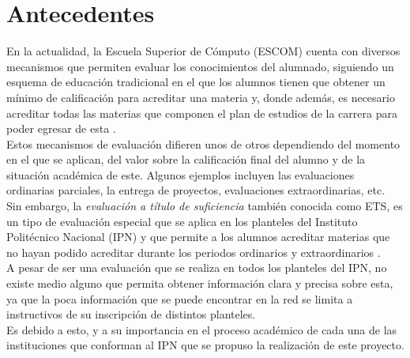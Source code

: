 
\section{Antecedentes}

En la actualidad, la Escuela Superior de Cómputo (ESCOM) cuenta con diversos mecanismos que permiten evaluar los conocimientos del alumnado, siguiendo un esquema de educación tradicional en el que los alumnos tienen que obtener un mínimo de calificación para acreditar una materia y, donde además, es necesario acreditar todas las materias que componen el plan de estudios de la carrera para poder egresar de esta \cite{L01}.\\

Estos mecanismos de evaluación difieren unos de otros dependiendo del momento en el que se aplican, del valor sobre la calificación final del alumno y de la situación académica de este. Algunos ejemplos incluyen las evaluaciones ordinarias parciales, la entrega de proyectos, evaluaciones extraordinarias, etc. \\

Sin embargo, la \textit{evaluación a título de suficiencia} también conocida como ETS, es un tipo de evaluación especial que se aplica en los planteles del Instituto Politécnico Nacional (IPN) y que permite a los alumnos acreditar materias que no hayan podido acreditar durante los periodos ordinarios y extraordinarios \cite{L02}. \\

A pesar de ser una evaluación que se realiza en todos los planteles del IPN, no existe medio alguno que permita obtener información clara y precisa sobre esta, ya que la poca información que se puede encontrar en la red se limita a instructivos de su inscripción de distintos planteles. \\

Es debido a esto, y a su importancia en el proceso académico de cada una de las instituciones que conforman al IPN que se propuso la realización de este proyecto. \\

 